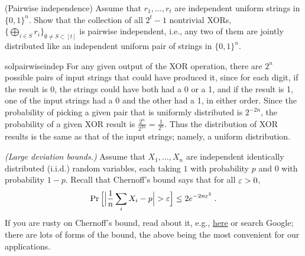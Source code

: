 \begin{questions}
  \question[6](Pairwise independence) Assume that $r_1,\ldots,r_t$ are independent uniform strings in $\{0,1\}^n$. 
	 Show that the collection of all $2^t-1$ nontrivial XORs, $\{\bigoplus_{i \in S} r_i\}_{\emptyset \neq S \subset [t]}$
	 is pairwise independent, i.e., any two of them are jointly distributed like an independent uniform
	pair of strings in $\{0,1\}^n$. 
    \begin{mysolution}{solpairwiseindep}
      For any given output of the XOR operation, there are $2^n$ possible pairs of input strings that could have produced it, since for each digit, if the result is 0, the strings could have both had a 0 or a 1, and if the result is 1, one of the input strings had a 0 and the other had a 1, in either order. Since the probability of picking a given pair that is uniformly distributed is $2^{-2n}$, the probability of a given XOR result is $\frac{2^n}{2^{2n}} = \frac{1}{2^n}$. Thus the distribution of XOR results is the same as that of the input strings; namely, a uniform distribution.
    \end{mysolution}




\question
	\emph{(Large deviation bounds.)}
Assume that $X_1,\ldots,X_n$ are independent identically distributed (i.i.d.) random variables, each taking $1$ with probability $p$ and $0$ with probability $1-p$. Recall that Chernoff's bound says that for all $\varepsilon>0$,
		\[
		  \Pr \Big[ \Big| \frac{1}{n} \sum_i X_i - p \Big| > \varepsilon \Big] \le 2 e^{-2 n \varepsilon^2} \; .
		\]
	  If you are rusty on Chernoff's bound, read about it, e.g., \href{www.cs.berkeley.edu/~sinclair/cs271/n13.pdf}{here} or search Google; there are lots of forms of the bound, the above being the most convenient for our applications.
		
\end{questions}
